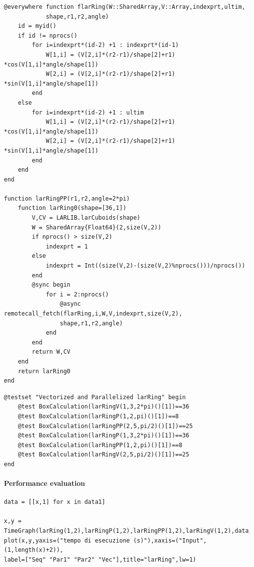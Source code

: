 \documentclass{article}
\begin{document}
\begin{Verbatim}
@everywhere function flarRing(W::SharedArray,V::Array,indexprt,ultim,
            shape,r1,r2,angle)
    id = myid()
    if id != nprocs()
        for i=indexprt*(id-2) +1 : indexprt*(id-1)
            W[1,i] = (V[2,i]*(r2-r1)/shape[2]+r1) *cos(V[1,i]*angle/shape[1])
            W[2,i] = (V[2,i]*(r2-r1)/shape[2]+r1) *sin(V[1,i]*angle/shape[1]) 
        end
    else
        for i=indexprt*(id-2) +1 : ultim
            W[1,i] = (V[2,i]*(r2-r1)/shape[2]+r1) *cos(V[1,i]*angle/shape[1])
            W[2,i] = (V[2,i]*(r2-r1)/shape[2]+r1) *sin(V[1,i]*angle/shape[1])
        end
    end
end

function larRingPP(r1,r2,angle=2*pi)
    function larRing0(shape=[36,1])
        V,CV = LARLIB.larCuboids(shape)
        W = SharedArray{Float64}(2,size(V,2))
        if nprocs() > size(V,2)
            indexprt = 1
        else
            indexprt = Int((size(V,2)-(size(V,2)%nprocs()))/nprocs())
        end
        @sync begin
            for i = 2:nprocs()
                @async remotecall_fetch(flarRing,i,W,V,indexprt,size(V,2),
                shape,r1,r2,angle)
            end
        end
        return W,CV
    end
    return larRing0
end
\end{Verbatim}

\begin{Verbatim}
@testset "Vectorized and Parallelized larRing" begin
    @test BoxCalculation(larRingV(1,3,2*pi)()[1])==36
    @test BoxCalculation(larRingP(1,2,pi)()[1])==8
    @test BoxCalculation(larRingPP(2,5,pi/2)()[1])==25
    @test BoxCalculation(larRingP(1,3,2*pi)()[1])==36
    @test BoxCalculation(larRingPP(1,2,pi)()[1])==8
    @test BoxCalculation(larRingV(2,5,pi/2)()[1])==25
end
\end{Verbatim}

\paragraph{Performance evaluation}

\begin{Verbatim}
data = [[x,1] for x in data1]

x,y = TimeGraph(larRing(1,2),larRingP(1,2),larRingPP(1,2),larRingV(1,2),data,5)
plot(x,y,yaxis=("tempo di esecuzione (s)"),xaxis=("Input",(1,length(x)+2)),
label=["Seq" "Par1" "Par2" "Vec"],title="larRing",lw=1)

\end{Verbatim}
\end{document}
